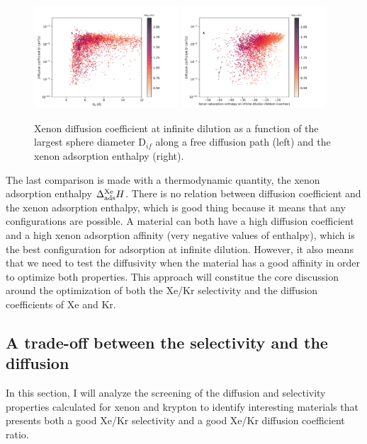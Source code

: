 \documentclass[main]{subfiles}
\begin{document}
\begin{figure}[ht]
  \centering
    \includegraphics[width=0.48\textwidth]{figures/5-diffusion/D_log-lcd_s_+.pdf}
    \includegraphics[width=0.48\textwidth]{figures/5-diffusion/D_log-H_Xe_s_+.pdf}
    \caption{Xenon diffusion coefficient at infinite dilution as a function of the largest sphere diameter D$_{if}$ along a free diffusion path (left) and the xenon adsorption enthalpy (right). }\label{fgr:diff_H_lcd}
\end{figure}

The last comparison is made with a thermodynamic quantity, the xenon adsorption enthalpy $\Delta_{\text{ads}}^{\text{Xe}}H$. There is no relation between diffusion coefficient and the xenon adsorption enthalpy, which is good thing because it means that any configurations are possible. A material can both have a high diffusion coefficient and a high xenon adsorption affinity (very negative values of enthalpy), which is the best configuration for adsorption at infinite dilution. However, it also means that we need to test the diffusivity when the material has a good affinity in order to optimize both properties. This approach will constitue the core discussion around the optimization of both the Xe/Kr selectivity and the diffusion coefficients of Xe and Kr.  

\subsection{A trade-off between the selectivity and the diffusion}

In this section, I will analyze the screening of the diffusion and selectivity properties calculated for xenon and krypton to identify interesting materials that presents both a good Xe/Kr selectivity and a good Xe/Kr diffusion coefficient ratio.
\end{document}
